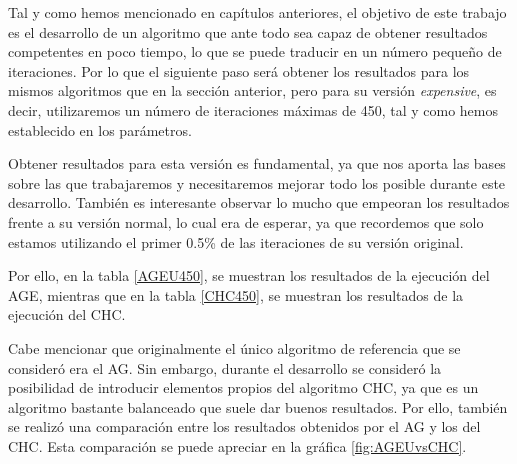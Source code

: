 Tal y como hemos mencionado en capítulos anteriores, el objetivo de este trabajo es el desarrollo de un algoritmo que ante todo sea capaz de obtener resultados competentes en poco tiempo, lo que se puede traducir en un número pequeño de iteraciones. 
Por lo que el siguiente paso será obtener los resultados para los mismos algoritmos que en la sección anterior, pero para su versión \textit{expensive}, es decir, utilizaremos un número de iteraciones máximas de 450, tal y como hemos establecido en los parámetros. 

Obtener resultados para esta versión es fundamental, ya que nos aporta las bases sobre las que trabajaremos y necesitaremos mejorar todo los posible durante este desarrollo. 
También es interesante observar lo mucho que empeoran los resultados frente a su versión normal, lo cual era de esperar, ya que recordemos que solo estamos utilizando el primer 0.5\% de las iteraciones de su versión original. 

Por ello, en la tabla \ref{AGEU450}, se muestran los resultados de la ejecución del AGE, mientras que en la tabla \ref{CHC450}, se muestran los resultados de la ejecución del CHC. 

Cabe mencionar que originalmente el único algoritmo de referencia que se consideró era el AG. 
Sin embargo, durante el desarrollo se consideró la posibilidad de introducir elementos propios del algoritmo CHC, ya que es un algoritmo bastante balanceado que suele dar buenos resultados. 
Por ello, también se realizó una comparación entre los resultados obtenidos por el AG y los del CHC. 
Esta comparación se puede apreciar en la gráfica \ref{fig:AGEUvsCHC}.



